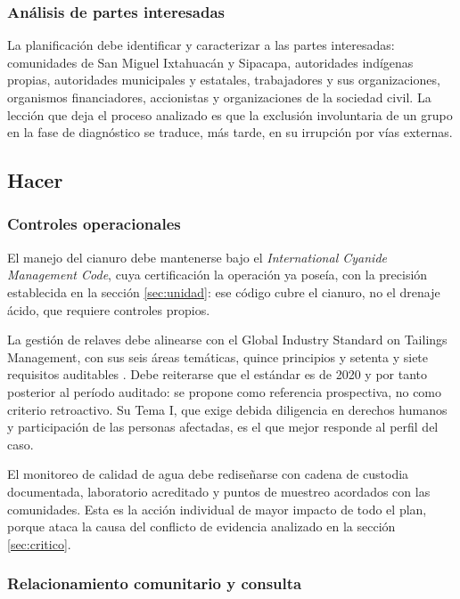 \subsubsection{Análisis de partes interesadas}

La planificación debe identificar y caracterizar a las partes interesadas:
comunidades de San Miguel Ixtahuacán y Sipacapa, autoridades indígenas propias,
autoridades municipales y estatales, trabajadores y sus organizaciones,
organismos financiadores, accionistas y organizaciones de la sociedad civil. La
lección que deja el proceso analizado es que la exclusión involuntaria de un
grupo en la fase de diagnóstico se traduce, más tarde, en su irrupción por vías
externas.

\subsection{Hacer}

\subsubsection{Controles operacionales}

El manejo del cianuro debe mantenerse bajo el \textit{International Cyanide
Management Code}, cuya certificación la operación ya poseía, con la precisión
establecida en la sección \ref{sec:unidad}: ese código cubre el cianuro, no el
drenaje ácido, que requiere controles propios.

La gestión de relaves debe alinearse con el Global Industry Standard on Tailings
Management, con sus seis áreas temáticas, quince principios y setenta y siete
requisitos auditables \parencite{icmm2020gistm}. Debe reiterarse que el estándar
es de 2020 y por tanto posterior al período auditado: se propone como referencia
prospectiva, no como criterio retroactivo. Su Tema I, que exige debida diligencia
en derechos humanos y participación de las personas afectadas, es el que mejor
responde al perfil del caso.

El monitoreo de calidad de agua debe rediseñarse con cadena de custodia
documentada, laboratorio acreditado y puntos de muestreo acordados con las
comunidades. Esta es la acción individual de mayor impacto de todo el plan, porque
ataca la causa del conflicto de evidencia analizado en la sección
\ref{sec:critico}.

\subsubsection{Relacionamiento comunitario y consulta}

